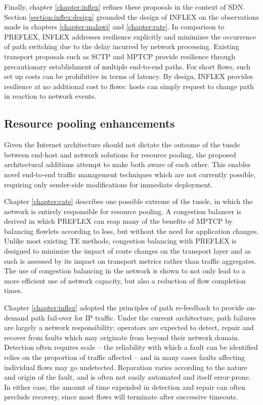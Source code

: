 Finally, chapter \ref{chapter:inflex} refines these proposals in the context of \ac{SDN}.
Section \ref{section:inflex:design} grounded the design of INFLEX on the observations made in chapters \ref{chapter:malawi} and \ref{chapter:rate}.
In comparison to \ac{PREFLEX}, INFLEX addresses resilience explicitly and minimizes the occurrence of path switching due to the delay incurred by network processing.
Existing transport proposals such as \ac{SCTP} and \ac{MPTCP} provide resilience through precautionary establishment of multiple end-to-end paths.
For short flows, such set up costs can be prohibitive in terms of latency.
By design, INFLEX provides resilience at no additional cost to flows: hosts can simply request to change path in reaction to network events.

\subsection{Resource pooling enhancements}

Given the Internet architecture should not dictate the outcome of the tussle between end-host and network solutions for resource pooling, the proposed architectural additions attempt to make both aware of each other.
This enables novel end-to-end traffic management techniques which are not currently possible, requiring only sender-side modifications for immediate deployment.

Chapter \ref{chapter:cate} describes one possible extreme of the tussle, in which the network is entirely responsible for resource pooling.
A congestion balancer is derived in which \ac{PREFLEX} can reap many of the benefits of \ac{MPTCP} by balancing flowlets according to loss, but without the need for application changes.
Unlike most existing \ac{TE} methods, congestion balancing with \ac{PREFLEX} is designed to minimize the impact of route changes on the transport layer and as such is assessed by its impact on transport metrics rather than traffic aggregates.
The use of congestion balancing in the network is shown to not only lead to a more efficient use of network capacity, but also a reduction of flow completion times.

Chapter \ref{chapter:inflex} adopted the principles of path re-feedback to provide on-demand path fail-over for \ac{IP} traffic.
Under the current architecture, path failures are largely a network responsibility: operators are expected to detect, repair and recover from faults which may originate from beyond their network domain.
Detection often requires scale -- the reliability with which a fault can be identified relies on the proportion of traffic affected -- and in many cases faults affecting individual flows may go undetected.
Reparation varies according to the nature and origin of the fault, and is often not easily automated and itself error-prone.
In either case, the amount of time expended in detection and repair can often preclude recovery, since most flows will terminate after successive timeouts.

